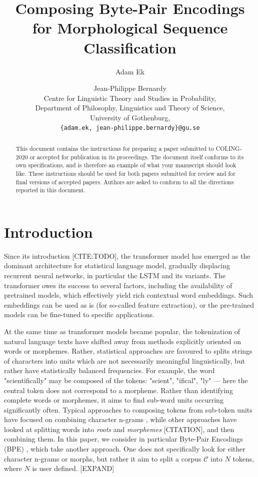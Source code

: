 \documentclass[11pt]{article}
\title{Composing Byte-Pair Encodings for Morphological Sequence Classification}
\author{Adam Ek \and Jean-Philippe Bernardy\\
	Centre for Linguistic Theory and Studies in Probability,\\
	Department of Philosophy, Linguistics and Theory of Science,\\
	University of Gothenburg,\\
	\texttt{\{adam.ek, jean-philippe.bernardy\}@gu.se}}
\date{}
\begin{document}
	\maketitle
	
	\begin{abstract}
		This document contains the instructions for preparing a paper submitted
		to COLING-2020 or accepted for publication in its proceedings. The document itself
		conforms to its own specifications, and is therefore an example of
		what your manuscript should look like. These instructions should be
		used for both papers submitted for review and for final versions of
		accepted papers. Authors are asked to conform to all the directions
		reported in this document.
	\end{abstract}
	
	\section{Introduction}
	\label{intro}

            Since its introduction [CITE:TODO], the transformer model
     \cite{vaswani2017attention} has emerged as the dominant
     architecture for statistical language model, gradually displacing
     recurrent neural networks, in particular the LSTM and its
     variants. The transformer owes its success to several factors,
     including the availability of pretrained models, which
     effectively yield rich contextual word embeddings. Such
     embeddings can be used as is (for so-called feature extraction),
     or the pre-trained models can be fine-tuned to specific
     applications.

    	At the same time as transformer models became popular, the
     tokenization of natural language texts have shifted away from
     methods explicitly oriented on words or morphemes. Rather,
     statistical approaches are favoured to splits strings of
     characters into units which are not necessarily meaningful
     linguistically, but rather have statistically balanced
     frequencies. For example, the word "scientifically" may be
     composed of the tokens: "scient", "ifical", "ly" --- here the
     central token does not correspond to a morpheme.
            Rather than identifying complete words or morphemes, it
     aims to find sub-word units occurring significantly
     often. Typical approaches to composing tokens from sub-token
     units have focused on combining character n-grams
     \cite{bojanowski2017enriching}, while other approaches have
     looked at splitting words into \textit{roots} and
     \textit{morphemes} [CITATION], and then combining them. In this paper, we
     consider in particular Byte-Pair Encodings (BPE)
     \cite{sennrich2015neural}, which take another approach. One does
     not specifically look for either character n-grams or morphs, but
     rather it aim to split a corpus $\mathcal{C}$ into $N$ tokens,
     where $N$ is user defined. [EXPAND]
\end{document}
